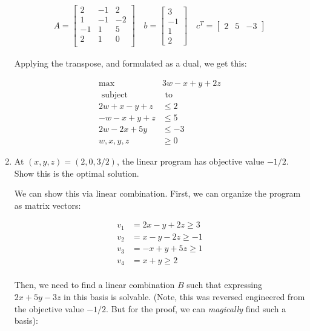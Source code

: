 \documentclass[11pt]{article}
\theoremstyle{definition}
\theoremstyle{case}
\theoremstyle{theorem}
\begin{document}
\begin{enumerate}[label=(\alph*)]
\begin{align*}
  A = \left[
        \begin{array}{ccc}
          2  & -1 &  2 \\
          1  & -1 & -2 \\
         -1  &  1 &  5 \\
          2  &  1 &  0 \\
        \end{array}
       \right] \quad
  b = \begin{bmatrix}
          3 \\
         -1 \\
          1 \\
          2
       \end{bmatrix} \quad
  c^T = \left[
          \begin{matrix}
            2 & 5 & -3 
          \end{matrix}
         \right]        
\end{align*}

Applying the transpose, and formulated as a dual, we get this:

\begin{align*}
  \max &3w -x + y + 2z\\
  \text{ subject} &\text{ to }\\
  2w + x - y + z &\leq 2\\
  -w -x + y + z &\leq 5\\
  2w -2x + 5y &\leq -3\\
  w,x,y,z &\geq 0
\end{align*}

\newpage

\item At $(x,y,z) = (2,0,3/2)$, the linear program has objective value $-1/2$. Show this is the optimal solution.

We can show this via linear combination. First, we can organize the program as matrix vectors:

\begin{align*}
  v_1 &= 2x - y + 2z \geq 3\\
  v_2 &= x - y - 2z \geq -1\\
  v_3 &= -x + y +5z \geq 1\\
  v_4 &= x + y \geq 2\\
\end{align*}

Then, we need to find a linear combination $B$ such that expressing $2x + 5y -3z$ in this basis 
is solvable. (Note, this was reversed engineered from the objective value $-1/2$. But for the proof, we 
can \textit{magically} find such a basis):


\end{enumerate}
\end{document}
